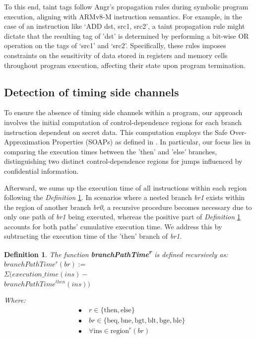 To this end, taint tags follow Angr's propagation rules during symbolic program execution, aligning with ARMv8-M instruction semantics. For example, in the case of an instruction like ‘ADD dst, src1, src2’, a taint propagation rule might dictate that the resulting tag of 'dst' is determined by performing a bit-wise OR operation on the tags of ‘src1’ and ‘src2’. Specifically, these rules imposes constraints on the sensitivity of data stored in registers and memory cells throughout program execution, affecting their state upon program termination. 

\subsection{Detection of timing side channels}

To ensure the absence of timing side channels within a program, our approach involves the initial computation of control-dependence regions for each branch instruction dependent on secret data. This computation employs the Safe Over-Approximation Properties (SOAPs) as defined in \cite{MantelAVR}. In particular, our focus lies in comparing the execution times between the 'then' and 'else' branches, distinguishing two distinct control-dependence regions for jumps influenced by confidential information.

Afterward, we sums up the execution time of all instructions within each region following the \textit{Definition} \ref{def:timing}. In scenarios where a nested branch \textit{br1} exists within the region of another branch \textit{br0}, a recursive procedure becomes necessary due to only one path of \textit{br1} being executed, whereas the positive part of \textit{Definition} \ref{def:timing} accounts for both paths' cumulative execution time. We address this by subtracting the execution time of the 'then' branch of \textit{br1}.

\newtheorem{definition}{Definition}[section]
\begin{definition}\label{def:timing}
    The function \textbf{branchPathTime\textsuperscript{r}} is defined recursively as: \\
   
   \noindent 
   $branchPathTime^r(br) := $ \\
     $\Sigma (execution\_time(ins) -$ \\
     $ branchPathTime^{then}(ins))$

   Where:
\begin{align*}
& \bullet \quad r \in \{ \text{then}, \text{else} \} \\
& \bullet \quad br \in \{ \text{beq}, \text{bne}, \text{bgt}, \text{blt}, \text{bge}, \text{ble} \} \\
& \bullet \quad \forall \text{ins} \in \text{region}^r(br)
\end{align*}

\end{definition}

